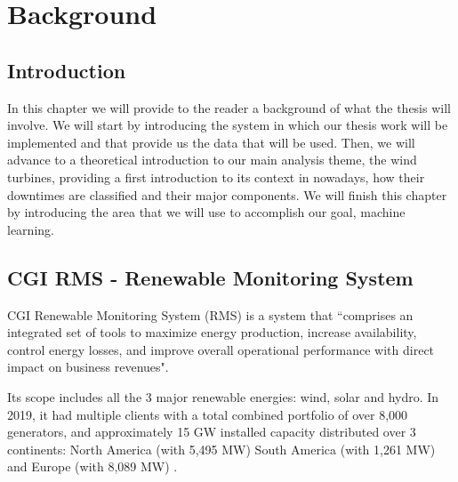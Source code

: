 


\chapter{Background}
\label{cha:background}


\section{Introduction} 
\label{sub:if_you_use_this_template} 

In this chapter we will provide to the reader a background of what the thesis will involve. We will start by introducing the system in which our thesis work will be implemented and that provide us the data that will be used. Then, we will advance to a theoretical introduction to our main analysis theme, the wind turbines, providing a first introduction to its context in nowadays, how their downtimes are classified and their major components. We will finish this chapter by introducing the area that we will use to accomplish our goal, machine learning.

\section{CGI RMS - Renewable Monitoring System} 
\label{sub:if_you_use_this_template} 

CGI Renewable Monitoring System (RMS) is a system that “comprises an integrated set of tools to maximize energy production, increase availability, control energy losses, and improve overall operational performance with direct impact on business revenues".

Its scope includes all the 3 major renewable energies: wind, solar and hydro. In 2019, it had multiple clients with a total combined portfolio of over 8,000 generators, and approximately 15 GW installed capacity distributed over 3 continents: North America (with 5,495 MW) South America (with 1,261 MW) and Europe (with 8,089 MW) \cite{OLD_8}.

